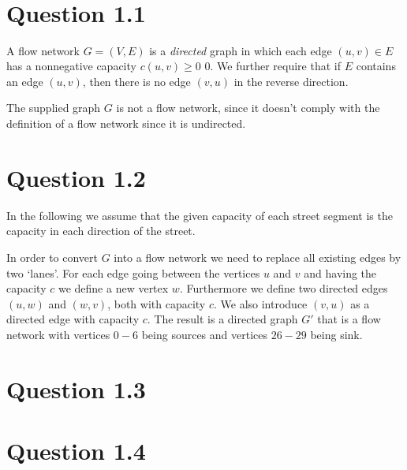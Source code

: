 \documentclass[10pt]{article}
\author{\authorName \\\texttt{\small{\authorEmail}}}
\title{\textsc{\titleName \\ \courseName}}
\begin{document}
\maketitle    

\section*{Question 1.1} %
\label{sec:question_1_1}


A flow network $G = (V,E)$ is a \emph{directed} graph in which each edge $(u,v) \in E$ has a nonnegative capacity $c(u,v)\geq 0$ 0. We further require that if $E$ contains an edge $(u,v)$, then there is no edge $(v,u)$ in the reverse direction\cite{Cormen}.

The supplied graph $G$ is not a flow network, since it doesn't comply with the definition of a flow network since it is undirected. 


\section*{Question 1.2} %
\label{sec:question_1_2}

In the following we assume that the given capacity of each street segment is the capacity in each direction of the street. 

In order to convert $G$ into a flow network we need to replace all existing edges by two `lanes'. For each edge going between the vertices $u$ and $v$ and having the capacity $c$ we define a new vertex $w$. Furthermore we define two directed edges $(u,w)$ and $(w,v)$, both with capacity $c$. We also introduce $(v,u)$ as a directed edge with capacity $c$. The result is a directed graph $G'$ that is a flow network with vertices $0-6$ being sources and vertices $26-29$ being sink. 


\section*{Question 1.3} %
\label{sec:question_1_3}



\section*{Question 1.4} %
\label{sec:question_1_4}





\end{document}
